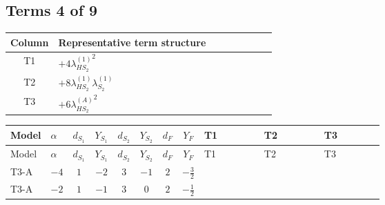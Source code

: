 \documentclass[8pt]{article}
\begin{document}
\begin{landscape}
\subsection*{Terms 4 of 9}
\begin{center}
\begin{tabular}{@{}c >{\raggedright\arraybackslash}p{0.82\linewidth}@{}}
\toprule
Column & Representative term structure \\
\midrule
T1 & \(\displaystyle +4 {\lambda_{HS_2}^{(1)}}^2\) \\
\midrule
T2 & \(\displaystyle +8 {\lambda_{HS_2}^{(1)}} {\lambda_{S_2}^{(1)}}\) \\
\midrule
T3 & \(\displaystyle +6 {\lambda_{HS_2}^{(A)}}^2\) \\
\midrule
\bottomrule
\end{tabular}
\end{center}
\smallskip
\tiny
\begin{longtable}{@{}llcccccc >{\raggedright\arraybackslash}p{0.21\linewidth} >{\raggedright\arraybackslash}p{0.21\linewidth} >{\raggedright\arraybackslash}p{0.21\linewidth}@{}}
\toprule
Model & $\alpha$ & $d_{S_1}$ & $Y_{S_1}$ & $d_{S_2}$ & $Y_{S_2}$ & $d_F$ & $Y_F$ & T1 & T2 & T3 \\
\midrule
\endfirsthead
\toprule
Model & $\alpha$ & $d_{S_1}$ & $Y_{S_1}$ & $d_{S_2}$ & $Y_{S_2}$ & $d_F$ & $Y_F$ & T1 & T2 & T3 \\
\midrule
\endhead
T3-A & $-4$ & $1$ & $-2$ & $3$ & $-1$ & $2$ & $-\frac{3}{2}$ & \scriptsize\adjustbox{max width=\linewidth}{$\begin{gathered} +4 {\lambda_{HS_2}^{(1)}}^2\end{gathered}$} & \scriptsize\adjustbox{max width=\linewidth}{$\begin{gathered} +8 {\lambda_{HS_2}^{(1)}} {\lambda_{S_2}^{(1)}}\end{gathered}$} & \scriptsize\adjustbox{max width=\linewidth}{$\begin{gathered} +6 {\lambda_{HS_2}^{(A)}}^2\end{gathered}$} \\
\midrule
T3-A & $-2$ & $1$ & $-1$ & $3$ & $0$ & $2$ & $-\frac{1}{2}$ & \scriptsize\adjustbox{max width=\linewidth}{$\begin{gathered} +4 {\lambda_{HS_2}^{(1)}}^2\end{gathered}$} & \scriptsize\adjustbox{max width=\linewidth}{$\begin{gathered} +8 {\lambda_{HS_2}^{(1)}} {\lambda_{S_2}^{(1)}}\end{gathered}$} & \scriptsize\adjustbox{max width=\linewidth}{$\begin{gathered} +6 {\lambda_{HS_2}^{(A)}}^2\end{gathered}$} \\

\end{longtable}
\end{landscape}
\end{document}
